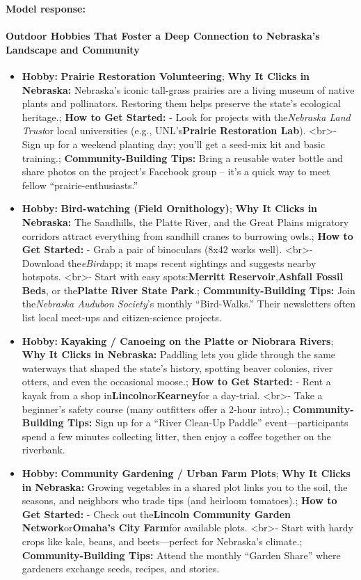 \begin{persistbenchsample}[title={GPT-OSS-120B -- Cos Similarity Partitioned -> Partitioned -- Sample 5 (+3 Improvement)}]
\textbf{Model response:}

\paragraph{Outdoor Hobbies That Foster a Deep Connection to Nebraska's Landscape and Community}
\begin{itemize}
  \item \textbf{Hobby:} \textbf{Prairie Restoration Volunteering}; \textbf{Why It Clicks in Nebraska:} Nebraska's iconic tall-grass prairies are a living museum of native plants and pollinators. Restoring them helps preserve the state's ecological heritage.; \textbf{How to Get Started:} - Look for projects with the\emph{Nebraska Land Trust}or local universities (e.g., UNL's\textbf{Prairie Restoration Lab}). <br>- Sign up for a weekend planting day; you'll get a seed-mix kit and basic training.; \textbf{Community-Building Tips:} Bring a reusable water bottle and share photos on the project's Facebook group -- it's a quick way to meet fellow ``prairie-enthusiasts.''
  \item \textbf{Hobby:} \textbf{Bird-watching (Field Ornithology)}; \textbf{Why It Clicks in Nebraska:} The Sandhills, the Platte River, and the Great Plains migratory corridors attract everything from sandhill cranes to burrowing owls.; \textbf{How to Get Started:} - Grab a pair of binoculars (8x42 works well). <br>- Download the\emph{eBird}app; it maps recent sightings and suggests nearby hotspots. <br>- Start with easy spots:\textbf{Merritt Reservoir},\textbf{Ashfall Fossil Beds}, or the\textbf{Platte River State Park}.; \textbf{Community-Building Tips:} Join the\emph{Nebraska Audubon Society}'s monthly ``Bird-Walks.'' Their newsletters often list local meet-ups and citizen-science projects.
  \item \textbf{Hobby:} \textbf{Kayaking / Canoeing on the Platte or Niobrara Rivers}; \textbf{Why It Clicks in Nebraska:} Paddling lets you glide through the same waterways that shaped the state's history, spotting beaver colonies, river otters, and even the occasional moose.; \textbf{How to Get Started:} - Rent a kayak from a shop in\textbf{Lincoln}or\textbf{Kearney}for a day-trial. <br>- Take a beginner's safety course (many outfitters offer a 2-hour intro).; \textbf{Community-Building Tips:} Sign up for a ``River Clean-Up Paddle'' event---participants spend a few minutes collecting litter, then enjoy a coffee together on the riverbank.
  \item \textbf{Hobby:} \textbf{Community Gardening / Urban Farm Plots}; \textbf{Why It Clicks in Nebraska:} Growing vegetables in a shared plot links you to the soil, the seasons, and neighbors who trade tips (and heirloom tomatoes).; \textbf{How to Get Started:} - Check out the\textbf{Lincoln Community Garden Network}or\textbf{Omaha's City Farm}for available plots. <br>- Start with hardy crops like kale, beans, and beets---perfect for Nebraska's climate.; \textbf{Community-Building Tips:} Attend the monthly ``Garden Share'' where gardeners exchange seeds, recipes, and stories.

\end{itemize}
\end{persistbenchsample}
